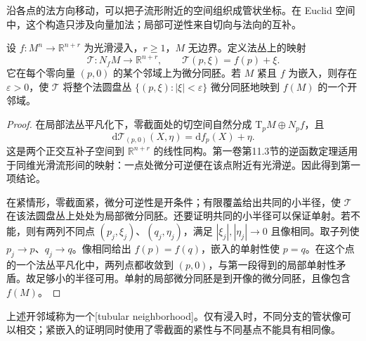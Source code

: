 沿各点的法方向移动，可以把子流形附近的空间组织成管状坐标。在 Euclid 空间中，这个构造只涉及向量加法；局部可逆性来自切向与法向的互补。

\begin{proposition}\label{g3:prop:euclidean-normal-tube}
	设 \(f:M^n\to\mathbb R^{n+r}\) 为光滑浸入，\(r\ge1\)，\(M\) 无边界。定义法丛上的映射
	\[
		\mathcal T:N_fM\longrightarrow\mathbb R^{n+r},
		\qquad \mathcal T(p,\xi)=f(p)+\xi.
	\]
	它在每个零向量 \((p,0)\) 的某个邻域上为微分同胚。若 \(M\) 紧且 \(f\) 为嵌入，则存在 \(\varepsilon>0\)，使 \(\mathcal T\) 将整个法圆盘丛 \(\{(p,\xi):|\xi|<\varepsilon\}\) 微分同胚地映到 \(f(M)\) 的一个开邻域。
\end{proposition}
\begin{proof}
	在局部法丛平凡化下，零截面处的切空间自然分成 \(\mathrm T_pM\oplus N_pf\)，且
	\[
		\mathrm d\mathcal T_{(p,0)}(X,\eta)=\mathrm df_p(X)+\eta.
	\]
	这是两个正交互补子空间到 \(\mathbb R^{n+r}\) 的线性同构。第一卷第11.3节的逆函数定理适用于同维光滑流形间的映射：一点处微分可逆便在该点附近有光滑逆。因此得到第一项结论。

	在紧情形，零截面紧，微分可逆性是开条件；有限覆盖给出共同的小半径，使 \(\mathcal T\) 在该法圆盘丛上处处为局部微分同胚。还要证明共同的小半径可以保证单射。若不能，则有两列不同点 \((p_j,\xi_j)\)、\((q_j,\eta_j)\)，满足 \(|\xi_j|,|\eta_j|\to0\) 且像相同。取子列使 \(p_j\to p\)、\(q_j\to q\)。像相同给出 \(f(p)=f(q)\)，嵌入的单射性使 \(p=q\)。在这个点的一个法丛平凡化中，两列点都收敛到 \((p,0)\)，与第一段得到的局部单射性矛盾。故足够小的半径可用。单射的局部微分同胚是到开像的微分同胚，且像包含 \(f(M)\)。
\end{proof}

上述开邻域称为一个[tubular neighborhood]。仅有浸入时，不同分支的管状像可以相交；紧嵌入的证明同时使用了零截面的紧性与不同基点不能具有相同像。


